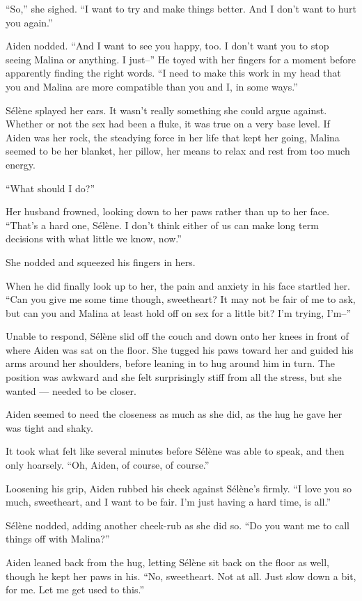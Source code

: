 ``So,'' she sighed. ``I want to try and make things better. And I don't want to hurt you again.''

Aiden nodded. ``And I want to see you happy, too. I don't want you to stop seeing Malina or anything. I just--'' He toyed with her fingers for a moment before apparently finding the right words. ``I need to make this work in my head that you and Malina are more compatible than you and I, in some ways.''

Sélène splayed her ears. It wasn't really something she could argue against. Whether or not the sex had been a fluke, it was true on a very base level. If Aiden was her rock, the steadying force in her life that kept her going, Malina seemed to be her blanket, her pillow, her means to relax and rest from too much energy.

``What should I do?''

Her husband frowned, looking down to her paws rather than up to her face. ``That's a hard one, Sélène. I don't think either of us can make long term decisions with what little we know, now.''

She nodded and squeezed his fingers in hers.

When he did finally look up to her, the pain and anxiety in his face startled her. ``Can you give me some time though, sweetheart? It may not be fair of me to ask, but can you and Malina at least hold off on sex for a little bit? I'm trying, I'm--''

Unable to respond, Sélène slid off the couch and down onto her knees in front of where Aiden was sat on the floor. She tugged his paws toward her and guided his arms around her shoulders, before leaning in to hug around him in turn. The position was awkward and she felt surprisingly stiff from all the stress, but she wanted --- needed to be closer.

Aiden seemed to need the closeness as much as she did, as the hug he gave her was tight and shaky.

It took what felt like several minutes before Sélène was able to speak, and then only hoarsely. ``Oh, Aiden, of course, of course.''

Loosening his grip, Aiden rubbed his cheek against Sélène's firmly. ``I love you so much, sweetheart, and I want to be fair. I'm just having a hard time, is all.''

Sélène nodded, adding another cheek-rub as she did so. ``Do you want me to call things off with Malina?''

Aiden leaned back from the hug, letting Sélène sit back on the floor as well, though he kept her paws in his. ``No, sweetheart. Not at all. Just slow down a bit, for me. Let me get used to this.''

